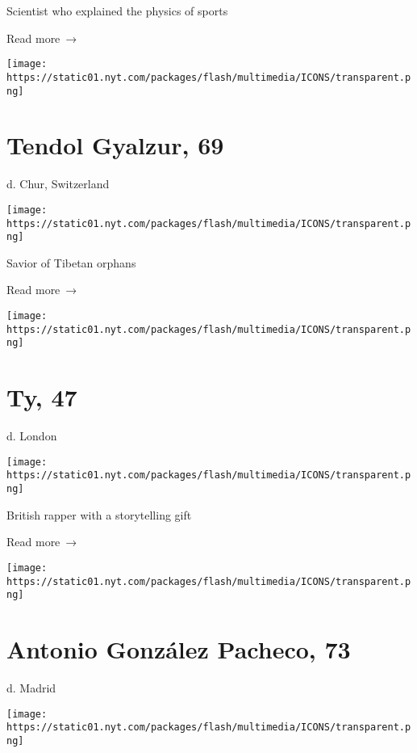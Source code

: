 Scientist who explained the physics of sports

 Read more~→

\href{https://www.nytimes.com/2020/05/15/obituaries/tendol-gyalzur-dead-coronavirus.html}{}

\texttt{[image: https://static01.nyt.com/packages/flash/multimedia/ICONS/transparent.png]}

\hypertarget{tendol-gyalzur-69}{%
\section{Tendol Gyalzur, 69}\label{tendol-gyalzur-69}}

d. Chur, Switzerland

\texttt{[image: https://static01.nyt.com/packages/flash/multimedia/ICONS/transparent.png]}

Savior of Tibetan orphans

 Read more~→

\href{https://www.nytimes.com/2020/05/15/obituaries/ty-dead.html}{}

\texttt{[image: https://static01.nyt.com/packages/flash/multimedia/ICONS/transparent.png]}

\hypertarget{ty-47}{%
\section{Ty, 47}\label{ty-47}}

d. London

\texttt{[image: https://static01.nyt.com/packages/flash/multimedia/ICONS/transparent.png]}

British rapper with a storytelling gift

 Read more~→

\href{https://www.nytimes.com/2020/05/15/obituaries/antonio-gonzalez-pacheco-accused-policeman-in-francos-spain-dies-at-73.html}{}

\texttt{[image: https://static01.nyt.com/packages/flash/multimedia/ICONS/transparent.png]}

\hypertarget{antonio-gonzuxe1lez-pacheco-73}{%
\section{Antonio González Pacheco,
73}\label{antonio-gonzuxe1lez-pacheco-73}}

d. Madrid

\texttt{[image: https://static01.nyt.com/packages/flash/multimedia/ICONS/transparent.png]}

